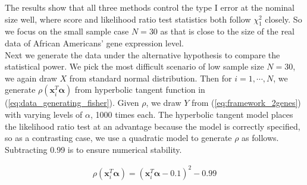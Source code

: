 \documentclass[aap, preprint]{imsart}
\numberwithin{equation}{section}
\theoremstyle{plain}
\begin{document}
The results show that all three methods control the type I error at the nominal size well, where score and likelihood ratio test statistics both follow $\chi_1^2$ closely. So we focus on the small sample case $N=30$ as that is close to the size of the real data of African Americans' gene expression level.\\

Next we generate the data under the alternative hypothesis to compare the statistical power. We pick the most difficult scenario of low sample size $N=30$, we again draw $X$ from standard normal distribution. Then for $i = 1, \cdots, N$, we generate $\rho(\bm{x}_i^T\bm{\alpha})$ from hyperbolic tangent function in (\ref{eq:data_generating_fisher}). Given $\rho$, we draw $Y$ from (\ref{eq:framework_2genes}) with varying levels of $\alpha$, 1000 times each. The hyperbolic tangent model places the likelihood ratio test at an advantage because the model is correctly specified, so as a contrasting case, we use a quadratic model to generate $\rho$ as follows. Subtracting 0.99 is to ensure numerical stability.

\begin{align}
    \rho(\bm{x}_i^T\bm{\alpha}) = (\bm{x}_i^T\bm{\alpha} - 0.1)^2 - 0.99
    \label{eq:data_generating2_quadratic}
\end{align}
\end{document}
